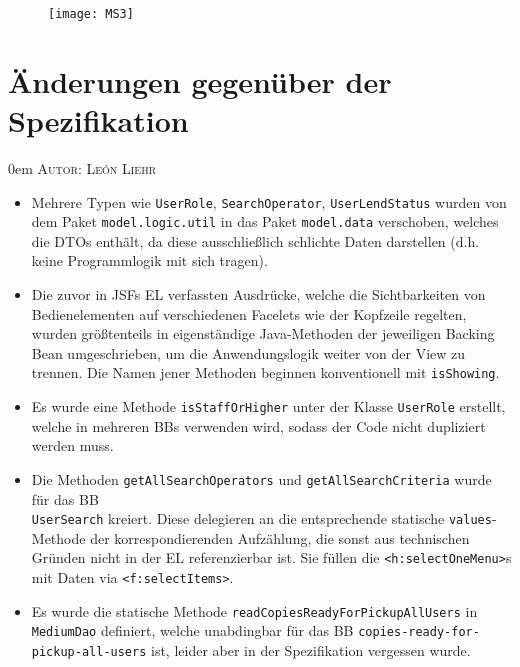 \documentclass{article}
\makeatletter
\newcommand{\sectionauthor}[1]{
	{\parindent 0em \large \scshape Autor: #1 \par \nobreak \vspace*{1em}}
	\@afterheading
}
\makeatother
\begin{document}
\newpage

\begin{figure}[h]
    \centering
    \texttt{[image: MS3]}
\end{figure}
\restoregeometry

\newpage

\section{Änderungen gegenüber der Spezifikation}
\sectionauthor{León Liehr}

\begin{itemize}
    \item Mehrere Typen wie \texttt{UserRole}, \texttt{SearchOperator}, \texttt{UserLendStatus} wurden von dem Paket \texttt{model.logic.util} in das Paket \texttt{model.data} verschoben, welches die DTOs enthält, da diese ausschließlich schlichte Daten darstellen (d.h. keine Programmlogik mit sich tragen).
    \item Die zuvor in JSFs EL verfassten Ausdrücke, welche die Sichtbarkeiten von Bedienelementen auf verschiedenen Facelets wie der Kopfzeile regelten, wurden größtenteils in eigenständige Java-Methoden der jeweiligen Backing Bean umgeschrieben, um die Anwendungslogik weiter von der View zu trennen. Die Namen jener Methoden beginnen konventionell mit \texttt{isShowing}.
    \item Es wurde eine Methode \texttt{isStaffOrHigher} unter der Klasse \texttt{UserRole} erstellt, welche in mehreren BBs verwenden wird, sodass der Code nicht dupliziert werden muss.
    \item Die Methoden \texttt{getAllSearchOperators} und \texttt{getAllSearchCriteria} wurde für das BB\\ \texttt{UserSearch} kreiert. Diese delegieren an die entsprechende statische \texttt{values}-Methode der korrespondierenden Aufzählung, die sonst aus technischen Gründen nicht in der EL referenzierbar ist. Sie füllen die \texttt{<h:selectOneMenu>}s mit Daten via \texttt{<f:selectItems>}.
    \item Es wurde die statische Methode \texttt{readCopiesReadyForPickupAllUsers} in \texttt{MediumDao} definiert, welche unabdingbar für das BB \texttt{copies-ready-for-pickup-all-users} ist, leider aber in der Spezifikation vergessen wurde.

\end{itemize}
\end{document}
